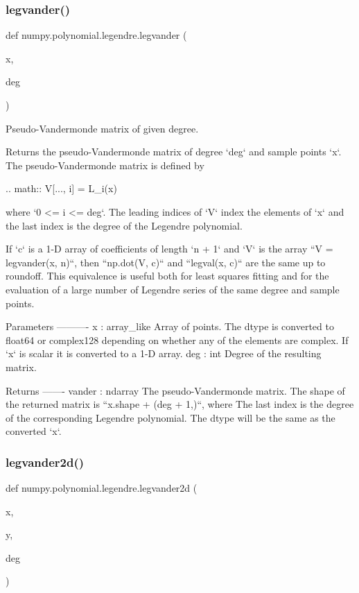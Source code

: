 \subsubsection{\texorpdfstring{legvander()}{legvander()}}
{\footnotesize\ttfamily def numpy.\+polynomial.\+legendre.\+legvander (\begin{DoxyParamCaption}\item[{}]{x,  }\item[{}]{deg }\end{DoxyParamCaption})}

\begin{DoxyVerb}Pseudo-Vandermonde matrix of given degree.

Returns the pseudo-Vandermonde matrix of degree `deg` and sample points
`x`. The pseudo-Vandermonde matrix is defined by

.. math:: V[..., i] = L_i(x)

where `0 <= i <= deg`. The leading indices of `V` index the elements of
`x` and the last index is the degree of the Legendre polynomial.

If `c` is a 1-D array of coefficients of length `n + 1` and `V` is the
array ``V = legvander(x, n)``, then ``np.dot(V, c)`` and
``legval(x, c)`` are the same up to roundoff. This equivalence is
useful both for least squares fitting and for the evaluation of a large
number of Legendre series of the same degree and sample points.

Parameters
----------
x : array_like
    Array of points. The dtype is converted to float64 or complex128
    depending on whether any of the elements are complex. If `x` is
    scalar it is converted to a 1-D array.
deg : int
    Degree of the resulting matrix.

Returns
-------
vander : ndarray
    The pseudo-Vandermonde matrix. The shape of the returned matrix is
    ``x.shape + (deg + 1,)``, where The last index is the degree of the
    corresponding Legendre polynomial.  The dtype will be the same as
    the converted `x`.\end{DoxyVerb}
 \mbox{\label{namespacenumpy_1_1polynomial_1_1legendre_a2451a9e091f4c82c839b02ca4bbcd080}} 
\subsubsection{\texorpdfstring{legvander2d()}{legvander2d()}}
{\footnotesize\ttfamily def numpy.\+polynomial.\+legendre.\+legvander2d (\begin{DoxyParamCaption}\item[{}]{x,  }\item[{}]{y,  }\item[{}]{deg }\end{DoxyParamCaption})}

